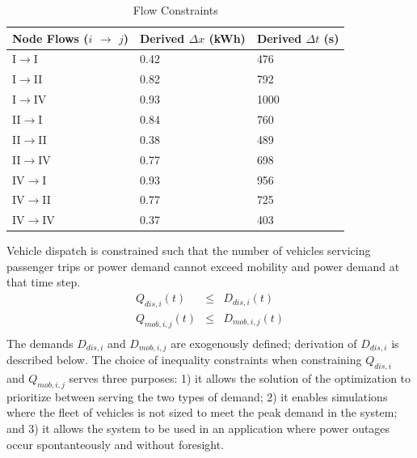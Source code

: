 \documentclass[conference]{IEEEtran}
\begin{document}
\begin{table}[!htbp]
    \renewcommand{\arraystretch}{1}
    \caption{Flow Constraints}
    \label{tab:flow_constraints}
    \centering
    \def\colmargin{6.75cm}
    \begin{tabular}{lll}
    \hline
    \textbf{Node Flows ($i$ $\rightarrow$ $j$)} & \textbf{Derived} $\Delta x$ (kWh) & \textbf{Derived} $\Delta t$ (s) \\
    \hline
    I$\rightarrow$I & 0.42  & 476  \\
    I$\rightarrow$II & 0.82  & 792  \\
    I$\rightarrow$IV & 0.93  & 1000  \\
    II$\rightarrow$I & 0.84  & 760  \\
    II$\rightarrow$II & 0.38  & 489  \\
    II$\rightarrow$IV & 0.77  & 698  \\
    IV$\rightarrow$I & 0.93  & 956  \\
    IV$\rightarrow$II & 0.77  & 725  \\
    IV$\rightarrow$IV & 0.37  & 403  \\
    \hline
    \end{tabular}
\end{table}
Vehicle dispatch is constrained such that the number of vehicles servicing passenger trips or power demand cannot exceed mobility and power demand at that time step.
\begin{eqnarray*}
   Q_{dis,i}(t) & \le & D_{dis,i}(t) \\
   Q_{mob,i,j}(t) & \le & D_{mob,i,j}(t) \\
\end{eqnarray*}
The demands $D_{dis,i}$ and $D_{mob,i,j}$ are exogenously defined; derivation of $D_{dis,i}$ is described below. The choice of inequality constraints when constraining $Q_{dis,i}$ and $Q_{mob,i,j}$ serves three purposes: 1) it allows the solution of the optimization to prioritize between serving the two types of demand; 2) it enables simulations where the fleet of vehicles is not sized to meet the peak demand in the system; and 3) it allows the system to be used in an application where power outages occur spontanteously and without foresight.
\end{document}
